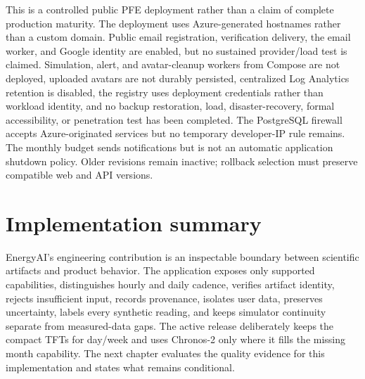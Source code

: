 This is a controlled public PFE deployment rather than a claim of complete production maturity. The deployment uses Azure-generated hostnames rather than a custom domain. Public email registration, verification delivery, the email worker, and Google identity are enabled, but no sustained provider/load test is claimed. Simulation, alert, and avatar-cleanup workers from Compose are not deployed, uploaded avatars are not durably persisted, centralized Log Analytics retention is disabled, the registry uses deployment credentials rather than workload identity, and no backup restoration, load, disaster-recovery, formal accessibility, or penetration test has been completed. The PostgreSQL firewall accepts Azure-originated services but no temporary developer-IP rule remains. The monthly budget sends notifications but is not an automatic application shutdown policy. Older revisions remain inactive; rollback selection must preserve compatible web and API versions.

\section{Implementation summary}

EnergyAI's engineering contribution is an inspectable boundary between scientific artifacts and product behavior. The application exposes only supported capabilities, distinguishes hourly and daily cadence, verifies artifact identity, rejects insufficient input, records provenance, isolates user data, preserves uncertainty, labels every synthetic reading, and keeps simulator continuity separate from measured-data gaps. The active release deliberately keeps the compact TFTs for day/week and uses Chronos-2 only where it fills the missing month capability. The next chapter evaluates the quality evidence for this implementation and states what remains conditional.
